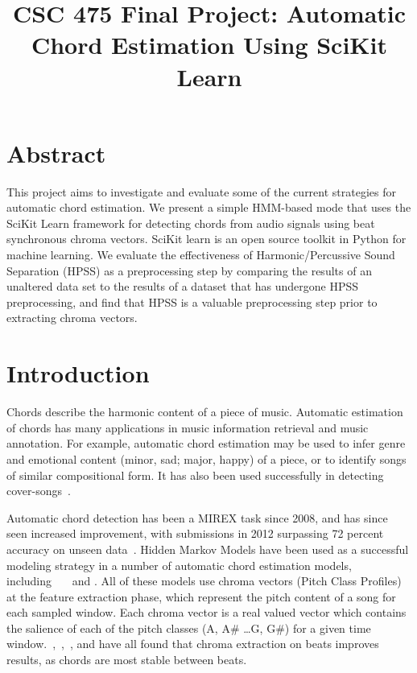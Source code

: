 \documentclass{article}
\title{CSC 475 Final Project: Automatic Chord Estimation Using SciKit Learn}
\begin{document}
%
\maketitle
%


\section{Abstract}\label{sec:desoutline}
This project aims to investigate and evaluate some of the current strategies
for automatic chord estimation. We present a simple HMM-based mode that uses
the SciKit Learn framework for detecting chords from audio signals using beat
synchronous chroma vectors.  SciKit learn is an open source toolkit in Python 
for machine learning. We evaluate the effectiveness of Harmonic/Percussive 
Sound Separation (HPSS) as a preprocessing step by
comparing the results of an unaltered data set to the results of a dataset that
has undergone HPSS preprocessing, and find that HPSS is a valuable
preprocessing step prior to extracting chroma vectors.

\section{Introduction}\label{sec:intro}

Chords describe the harmonic content of a piece of music. Automatic estimation
of chords has many applications in music information retrieval and music
annotation. For example, automatic chord estimation may be used to infer
genre and emotional content (minor, sad; major, happy) of a piece, or to
identify songs of similar compositional form.  It has also been used successfully in
detecting cover-songs~\cite{Papadopoulos:18}.

Automatic chord detection has been a MIREX task since 2008, and has since seen
increased improvement, with submissions in 2012 surpassing 72 percent accuracy
on unseen data~\cite{McVicar:00}. Hidden Markov Models have been used as a
successful modeling strategy in a number of automatic chord estimation models,
including~\cite{Ueda:01}~\cite{Lee:15}~\cite{Ueda:19} and
\cite{Papadopoulos:18}. All of these models use chroma vectors (Pitch Class
Profiles) at the feature extraction phase, which represent the pitch content
of a song for each sampled window. Each chroma vector is a real valued vector
which contains the salience of each of the pitch classes (A, A\# \dots G, G\#) for a
given time window.~\cite{McVicar:00},~\cite{Lee:15},~\cite{Papadopoulos:18},
and\cite{Zenz:20} have all found that chroma extraction on beats improves
results, as chords are most stable between beats.
\end{document}
